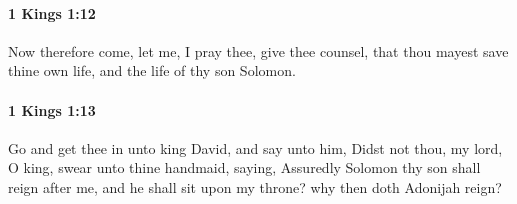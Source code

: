 		\paragraph{1 Kings 1:12} %
			\label{1KINGS-1-12}

			Now therefore come, let me, I pray thee, give thee counsel, that thou mayest save thine own life, and the life of thy son Solomon.


		\paragraph{1 Kings 1:13} %
			\label{1KINGS-1-13}

			Go and get thee in unto king David, and say unto him, Didst not thou, my lord, O king, swear unto thine handmaid, saying, Assuredly Solomon thy son shall reign after me, and he shall sit upon my throne? why then doth Adonijah reign?


